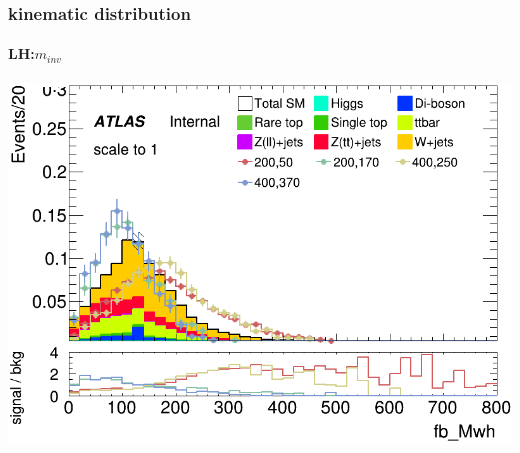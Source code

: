 \documentclass[usenames,dvipsnames]{beamer}
\begin{document}
\begin{frame}

	\frametitle{kinematic distribution}
	\framesubtitle{LH:$m_{inv}$}
    \begin{minipage}{0.32\textwidth}
        \centering
        \setlength{\fboxsep}{0pt} %
        \setlength{\fboxrule}{1pt} %
    \end{minipage}
    \hfill
    \begin{minipage}{0.32\textwidth}
        \centering
        \includegraphics[width=\textwidth]{graphics/LH_met_sig/LH_fb_Mwh_norm.png}
    \end{minipage}
    \hfill
    \begin{minipage}{0.32\textwidth}

\end{minipage}
\end{frame}
\end{document}
